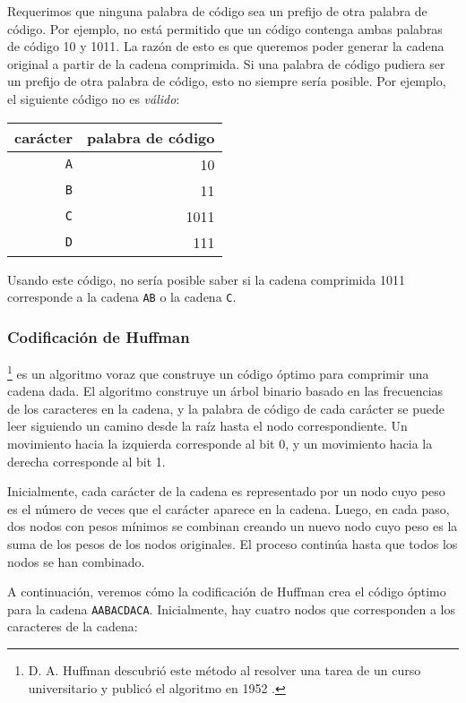 Requerimos que ninguna palabra de código
sea un prefijo de otra palabra de código.
Por ejemplo, no está permitido que un código
contenga ambas palabras de código 10
y 1011.
La razón de esto es que queremos
poder generar la cadena original
a partir de la cadena comprimida.
Si una palabra de código pudiera ser un prefijo de otra palabra de código,
esto no siempre sería posible.
Por ejemplo, el siguiente código no es \emph{válido}:
\begin{center}
\begin{tabular}{rr}
carácter & palabra de código \\
\hline
\texttt{A} & 10 \\
\texttt{B} & 11 \\
\texttt{C} & 1011 \\
\texttt{D} & 111 \\
\end{tabular}
\end{center}
Usando este código, no sería posible saber
si la cadena comprimida 1011 corresponde a
la cadena \texttt{AB} o la cadena \texttt{C}.


\subsubsection{Codificación de Huffman}

\footnote{D. A. Huffman descubrió este método
al resolver una tarea de un curso universitario
y publicó el algoritmo en 1952 \cite{huf52}.} es un algoritmo voraz
que construye un código óptimo para
comprimir una cadena dada.
El algoritmo construye un árbol binario
basado en las frecuencias de los caracteres
en la cadena,
y la palabra de código de cada carácter se puede leer
siguiendo un camino desde la raíz hasta
el nodo correspondiente.
Un movimiento hacia la izquierda corresponde al bit 0,
y un movimiento hacia la derecha corresponde al bit 1.

Inicialmente, cada carácter de la cadena es
representado por un nodo cuyo peso es el
número de veces que el carácter aparece en la cadena.
Luego, en cada paso, dos nodos con pesos mínimos
se combinan creando
un nuevo nodo cuyo peso es la suma de los pesos
de los nodos originales.
El proceso continúa hasta que todos los nodos se han combinado.

A continuación, veremos cómo la codificación de Huffman crea
el código óptimo para la cadena
\texttt{AABACDACA}.
Inicialmente, hay cuatro nodos que corresponden
a los caracteres de la cadena:

